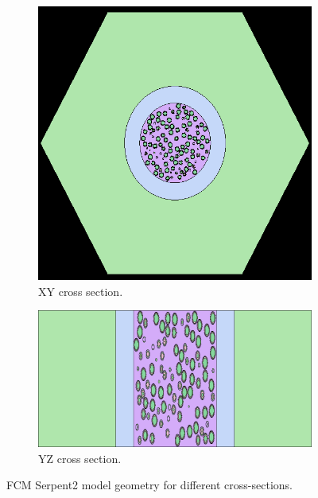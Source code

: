 \documentclass[11pt,letterpaper]{article}
\begin{document}
\begin{figure}[H]
	\centering
	\begin{subfigure}[t]{0.4\textwidth}
		\centering
		\includegraphics[width=\linewidth]{figures/FCM_geom1.png} 
		\caption{XY cross section.}
		\label{fig:FCM_xy}
	\end{subfigure}
	\vspace{1cm}
	\begin{subfigure}[t]{0.4\textwidth}
		\centering
		\includegraphics[width=\linewidth]{figures/FCM_geom2.png} 
		\caption{YZ cross section.}
		\label{fig:FCM_yz}
	\end{subfigure}
	\hfill
	\caption{FCM Serpent2 model geometry for different cross-sections.}
	\label{fig:FCM}
\end{figure}
\end{document}
